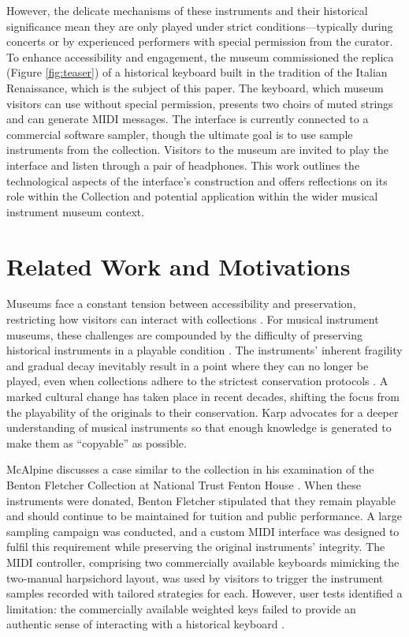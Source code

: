 However, the delicate mechanisms of these instruments and their historical significance mean they are only played under strict conditions—typically during concerts or by experienced performers with special permission from the curator. 
To enhance accessibility and engagement, the museum commissioned the replica (Figure \ref{fig:teaser}) of a historical keyboard built in the tradition of the Italian Renaissance, which is the subject of this paper.
The keyboard, which museum visitors can use without special permission, presents two choirs of muted strings and can generate MIDI messages. The interface is currently connected to a commercial software sampler, though the ultimate goal is to use sample instruments from the collection. Visitors to the museum are invited to play the interface and listen through a pair of headphones. This work outlines the technological aspects of the interface's construction and offers reflections on its role within the  Collection and potential application within the wider musical instrument museum context. 


\section{Related Work and Motivations}\label{related-work}


Museums face a constant tension between accessibility and preservation, restricting how visitors can interact with collections \cite{Templeton2018, McAlpine2014}. For musical instrument museums, these challenges are compounded by the difficulty of preserving historical instruments in a playable condition \cite{McAlpine2014}. The instruments' inherent fragility and gradual decay inevitably result in a point where they can no longer be played, even when collections adhere to the strictest conservation protocols \cite{NYT_strad}. A marked cultural change has taken place in recent decades, shifting the focus from the playability of the originals to their conservation. Karp \cite{Karp1979,Karp1985} advocates for a deeper understanding of musical instruments so that enough knowledge is generated to make them as ``copyable'' as possible.

McAlpine discusses a case similar to the  collection in his examination of the Benton Fletcher Collection at National Trust Fenton House \cite{McAlpine2014}. When these instruments were donated, Benton Fletcher stipulated that they remain playable and should continue to be maintained for tuition and public performance. A large sampling campaign was conducted, and a custom MIDI interface was designed to fulfil this requirement while preserving the original instruments' integrity. The MIDI controller, comprising two commercially available keyboards mimicking the two-manual harpsichord layout, was used by visitors to trigger the instrument samples recorded with tailored strategies for each. However, user tests identified a limitation: the commercially available weighted keys failed to provide an authentic sense of interacting with a historical keyboard \cite{McAlpine2014}. 

